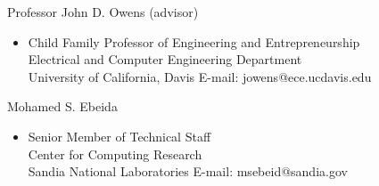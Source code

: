\documentclass[10pt]{article}
\newenvironment{innerlist}[1][\enskip\textbullet]%
        {\begin{itemize}[#1,leftmargin=*,parsep=0pt,itemsep=0pt,topsep=0pt,partopsep=0pt]}
        {\end{itemize}}
\newcommand{\halfblankline}{\quad\vspace{-0.5\baselineskip}\pagebreak[3]}
\begin{document}
Professor John D. Owens (advisor)

\begin{innerlist}
        \item[]Child Family Professor of Engineering and Entrepreneurship \\
        Electrical and Computer Engineering Department\\
        University of California, Davis \hfill{E-mail: jowens@ece.ucdavis.edu}\\
\end{innerlist}

\halfblankline


Mohamed S. Ebeida
\begin{innerlist}
        \item[] Senior Member of Technical Staff \\
        Center for Computing Research \\
        Sandia National Laboratories \hfill{E-mail: msebeid@sandia.gov}
\end{innerlist}

\halfblankline
\end{document}
